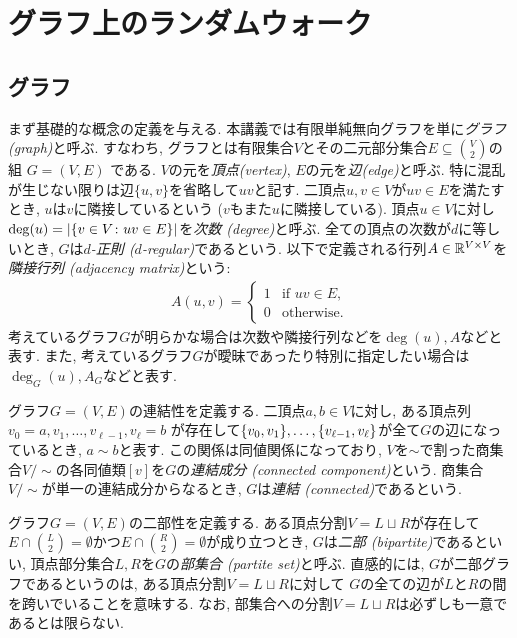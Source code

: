 \section{グラフ上のランダムウォーク}
\subsection{グラフ}
まず基礎的な概念の定義を与える.
本講義では有限単純無向グラフを単に\emph{グラフ (graph)}と呼ぶ.
すなわち, グラフとは有限集合$V$とその二元部分集合$E\subseteq \binom{V}{2}$の組 $G = (V, E)$ である.
$V$の元を\emph{頂点(vertex)}, $E$の元を\emph{辺(edge)}と呼ぶ.
特に混乱が生じない限りは辺$\{u,v\}$を省略して$uv$と記す.
二頂点$u,v\in V$が$uv\in E$を満たすとき, $u$は$v$に隣接しているという ($v$もまた$u$に隣接している).
頂点$u\in V$に対し$\deg(u) = \lvert\lbrace v \in V \colon uv\in E\rbrace\rvert$を\emph{次数 (degree)}と呼ぶ.
全ての頂点の次数が$d$に等しいとき, $G$は\emph{$d$-正則 ($d$-regular)}であるという.
以下で定義される行列$A \in \mathbb{R}^{V\times V}$を\emph{隣接行列 (adjacency matrix)}という:
\begin{align*}
  A(u,v) = \begin{cases}
    1	& \text{if }uv\in E,\\
    0 & \text{otherwise}.
  \end{cases}
\end{align*}
考えているグラフ$G$が明らかな場合は次数や隣接行列などを$\deg(u),A$などと表す.
また, 考えているグラフ$G$が曖昧であったり特別に指定したい場合は$\deg_G(u),A_G$などと表す.

グラフ$G=(V,E)$の連結性を定義する.
二頂点$a,b\in V$に対し,
  ある頂点列$v_0=a,v_1,\dots,v_{\ell-1},v_\ell = b$
  が存在して$\lbrace v_0,v_1\rbrace,\dots,\lbrace v_{\ell-1},v_\ell\rbrace$が全て$G$の辺になっているとき,
  $a\sim b$と表す.
この関係は同値関係になっており, $V$を$\sim$で割った商集合$V / \sim$の各同値類$[v]$を$G$の\emph{連結成分 (connected component)}という.
商集合$V / \sim$が単一の連結成分からなるとき, $G$は\emph{連結 (connected)}であるという.

グラフ$G=(V,E)$の二部性を定義する.
ある頂点分割$V=L\sqcup R$が存在して$E\cap \binom{L}{2}=\emptyset$かつ$E\cap \binom{R}{2}=\emptyset$が成り立つとき, $G$は\emph{二部 (bipartite)}であるといい,
頂点部分集合$L,R$を$G$の\emph{部集合 (partite set)}と呼ぶ.
直感的には, $G$が二部グラフであるというのは, ある頂点分割$V=L\sqcup R$に対して
$G$の全ての辺が$L$と$R$の間を跨いでいることを意味する.
なお, 部集合への分割$V = L\sqcup R$は必ずしも一意であるとは限らない.

